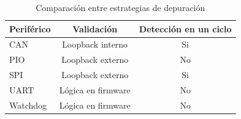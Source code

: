 \begin{table}[h]
	\centering
	\caption[Estrategias de depuración]{Comparación entre estrategias de depuración}

	\begin{tabular}{l c c}    
		\toprule
        \textbf{Periférico} & \textbf{Validación}       & \textbf{Detección en un ciclo}\\
		\midrule
		CAN                 & Loopback interno          & Si\\		
		PIO                 & Loopback externo          & No\\
		SPI                 & Loopback externo          & Si\\
		UART                & Lógica en firmware        & No\\
		Watchdog            & Lógica en firmware        & No\\
		\bottomrule
		\hline
	\end{tabular}
	\label{tab:perifericos}
\end{table}
